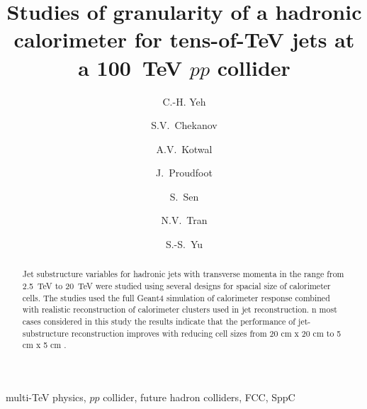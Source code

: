 \documentclass[final,1p,11pt]{elsarticle}
\begin{document}
\begin{frontmatter}

\title{
Studies of granularity of a hadronic calorimeter for tens-of-TeV jets  at a 100~TeV $pp$ collider 
}

\author[add3]{C.-H. Yeh}

\author[add1]{S.V.~Chekanov}

\author[addDuke,add2]{A.V.~Kotwal}

\author[add1]{J.~Proudfoot}

\author[addDuke]{S.~Sen}

\author[add2]{N.V.~Tran}

\author[add3]{S.-S.~Yu}

\address[add3]{
Department of Physics, National Central University, Chung-Li, Taoyuan City 32001, Taiwan
}

\address[add1]{
HEP Division, Argonne National Laboratory,
9700 S.~Cass Avenue,
Argonne, IL 60439, USA. 
}

\address[addDuke]{
Department of Physics, Duke University, USA
}

\address[add2]{
Fermi National Accelerator Laboratory
}

\address[addMSU]{
Department of Physics, Michigan State University, 220
Trowbridge Road, East Lansing, MI 48824 
}




\begin{abstract}
Jet substructure variables for hadronic jets with transverse momenta in the range from 2.5~TeV to 20~TeV
were studied using several designs for spacial size of calorimeter cells. The studies  used 
the full Geant4 simulation 
of calorimeter response combined with realistic reconstruction of calorimeter clusters used 
in jet reconstruction. 
n most cases considered in this study the results indicate that the performance of jet-substructure reconstruction improves with reducing cell sizes from 20 cm x 20 cm to 5 cm x 5 cm .
 

\end{abstract}

\begin{keyword}
multi-TeV physics, $pp$ collider, future hadron colliders, FCC, SppC
\end{keyword}



\end{frontmatter}
\end{document}
